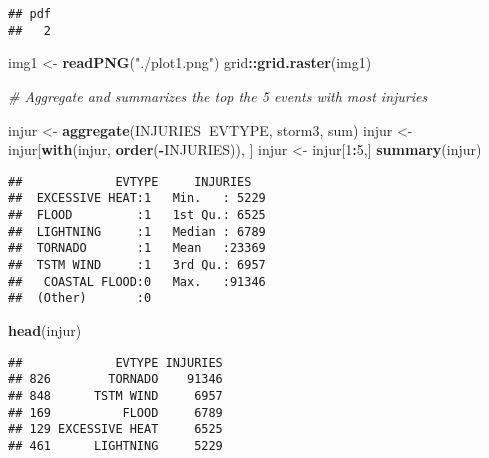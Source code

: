 \documentclass[]{article}
\newenvironment{Shaded}{\begin{snugshade}}{\end{snugshade}}
\newcommand{\KeywordTok}[1]{\textcolor[rgb]{0.13,0.29,0.53}{\textbf{#1}}}
\newcommand{\DataTypeTok}[1]{\textcolor[rgb]{0.13,0.29,0.53}{#1}}
\newcommand{\DecValTok}[1]{\textcolor[rgb]{0.00,0.00,0.81}{#1}}
\newcommand{\StringTok}[1]{\textcolor[rgb]{0.31,0.60,0.02}{#1}}
\newcommand{\CommentTok}[1]{\textcolor[rgb]{0.56,0.35,0.01}{\textit{#1}}}
\newcommand{\OperatorTok}[1]{\textcolor[rgb]{0.81,0.36,0.00}{\textbf{#1}}}
\newcommand{\NormalTok}[1]{#1}
\begin{document}
\begin{verbatim}
## pdf 
##   2
\end{verbatim}

\begin{Shaded}
\begin{Highlighting}[]
\NormalTok{  img1 <-}\StringTok{ }\KeywordTok{readPNG}\NormalTok{(}\StringTok{"./plot1.png"}\NormalTok{)}
\NormalTok{  grid}\OperatorTok{::}\KeywordTok{grid.raster}\NormalTok{(img1)}
  
\CommentTok{# Aggregate and summarizes the top the 5 events with most injuries  }
  
\NormalTok{  injur <-}\StringTok{ }\KeywordTok{aggregate}\NormalTok{(INJURIES}\OperatorTok{~}\NormalTok{EVTYPE, storm3, sum)}
\NormalTok{  injur <-}\StringTok{ }\NormalTok{injur[}\KeywordTok{with}\NormalTok{(injur, }\KeywordTok{order}\NormalTok{(}\OperatorTok{-}\NormalTok{INJURIES)), ]}
\NormalTok{  injur <-}\StringTok{ }\NormalTok{injur[}\DecValTok{1}\OperatorTok{:}\DecValTok{5}\NormalTok{,]}
  \KeywordTok{summary}\NormalTok{(injur)}
\end{Highlighting}
\end{Shaded}

\begin{verbatim}
##             EVTYPE     INJURIES    
##  EXCESSIVE HEAT:1   Min.   : 5229  
##  FLOOD         :1   1st Qu.: 6525  
##  LIGHTNING     :1   Median : 6789  
##  TORNADO       :1   Mean   :23369  
##  TSTM WIND     :1   3rd Qu.: 6957  
##   COASTAL FLOOD:0   Max.   :91346  
##  (Other)       :0
\end{verbatim}

\begin{Shaded}
\begin{Highlighting}[]
  \KeywordTok{head}\NormalTok{(injur)}
\end{Highlighting}
\end{Shaded}

\begin{verbatim}
##             EVTYPE INJURIES
## 826        TORNADO    91346
## 848      TSTM WIND     6957
## 169          FLOOD     6789
## 129 EXCESSIVE HEAT     6525
## 461      LIGHTNING     5229
\end{verbatim}

\begin{Shaded}
\end{Shaded}
\end{document}
